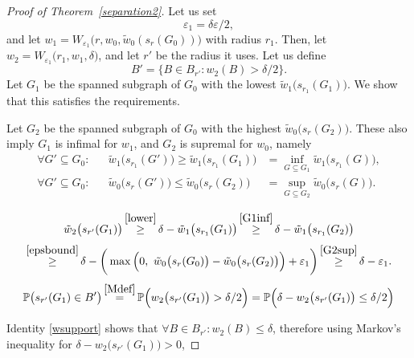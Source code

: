 \documentclass[12pt,a4paper]{article}
\newcommand{\eps}{\varepsilon}
\renewcommand{\P}{\mathbb{P}}
\renewcommand{\:}{\colon}
\begin{document}
\begin{proof}[Proof of Theorem~\ref{separation2}]
Let us set
\begin{equation} \label{eps1}
\eps_1 = \delta \eps / 2,
\end{equation}
and let $w_1 = W_{\eps_1}\big(r, w_0, \tilde{w}_0(s_r(G_0))\big)$ with radius $r_1$. Then, let $w_2 = W_{\eps_1}\big(r_1, w_1, \delta\big)$, and let $r'$ be the radius it uses. Let us define
\begin{equation} \label{Mdef}
B' = \big\{ B \in B_{r'}: w_2(B) > \delta / 2 \big\}.
\end{equation}
Let $G_1$ be the spanned subgraph of $G_0$ with the lowest $\tilde{w}_1\big(s_{r_1}(G_1)\big)$. We show that this satisfies the requirements.

Let $G_2$ be the spanned subgraph of $G_0$ with the highest $\tilde{w}_0\big(s_r(G_2)\big)$. These also imply $G_1$ is infimal for $w_1$, and $G_2$ is supremal for $w_0$, namely
\begin{align}
\forall G' \subseteq G_0:&& \tilde{w}_1\big(s_{r_1}(G')\big) \ge \tilde{w}_1\big(s_{r_1}(G_1)\big) &= \inf_{G \subseteq G_1} \tilde{w}_1\big(s_{r_1}(G)\big), \label{G1inf}
\\ \forall G' \subseteq G_0:&& \tilde{w}_0\big(s_r(G')\big) \le \tilde{w}_0\big(s_r(G_2)\big) &= \sup_{G \subseteq G_2} \tilde{w}_0\big(s_r(G)\big). \label{G2sup}
\end{align}

\begin{equation*}
\tilde{w}_2\big(s_{r'}(G_1)\big)
\mathop{\ge}^{\eqref{lower}}
\delta - \tilde{w}_1\big(s_{r_1}(G_1)\big)
\mathop{\ge}^{\eqref{G1inf}} \delta - \tilde{w}_1\big(s_{r_1}(G_2)\big)
\end{equation*}
\begin{equation} \label{w2G1}
\mathop{\ge}^{\eqref{epsbound}}
\delta - \bigg( \max\Big(0,\ \tilde{w}_0\big(s_r(G_0)\big) - \tilde{w}_0\big(s_r(G_2)\big)\Big) + \eps_1 \bigg)
\mathop{\ge}^{\eqref{G2sup}}
\delta - \eps_1.
\end{equation}
\begin{equation} \label{PG1}
\P\big(s_{r'}(G_1) \in B'\big)
\mathop{=}^{\eqref{Mdef}} \P\Big( w_2\big(s_{r'}(G_1)\big) > \delta / 2 \Big)
= \P\Big( \delta - w_2\big(s_{r'}(G_1)\big) \le \delta / 2 \Big)
\end{equation}

Identity \eqref{wsupport} shows that $\forall B \in B_{r'}\: w_2(B) \le \delta$, therefore using Markov's inequality for $\delta - w_2\big(s_{r'}(G_1)\big) > 0$,


\end{proof}
\end{document}
